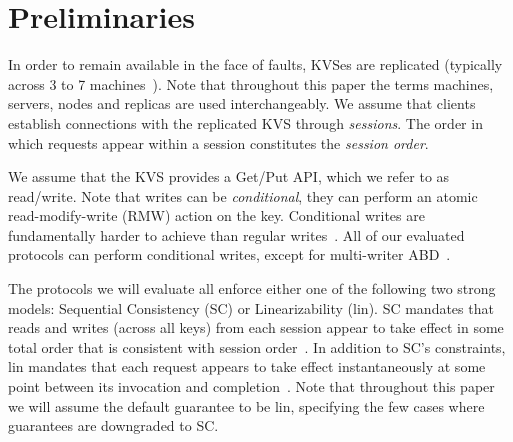 \section{Preliminaries}
\label{sec:prel}



 
In order to remain available in the face of faults, KVSes are replicated (typically across 3 to 7 machines~\cite{Hunt:2010}). Note that throughout this paper
the terms machines, servers, nodes and replicas are used interchangeably.
We assume that clients establish connections with the replicated KVS through \emph{sessions}. 
The order in which requests appear within a session constitutes the \emph{session order}.

We assume that the KVS provides a Get/Put API, which we refer to as read/write.
Note that writes can be \emph{conditional}, \ie they can perform an atomic read-modify-write (RMW) action on the key. Conditional writes are fundamentally harder to achieve than regular writes~\cite{Herlihy:2008}.
All of our evaluated protocols can perform conditional writes, except for multi-writer ABD~\cite{Lynch:1997}. 


The protocols we will evaluate all enforce either one of the following two strong models: 
Sequential Consistency (SC) or Linearizability (lin).
SC mandates that reads and writes (across all keys) from each session appear to take effect in some total order that is consistent with session order~\cite{Lamport:1979}.  
In addition to SC's constraints, lin mandates that each request appears to take effect instantaneously at some point between its invocation and completion~\cite{Herlihy:1990}. 
Note that throughout this paper we will assume the default guarantee to be lin, specifying the few cases where guarantees are downgraded to SC.






